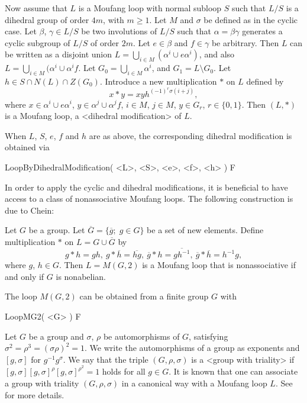 Now assume that $L$ is a Moufang loop with normal subloop $S$ such that $L/S$
is a dihedral group of order $4m$, with $m\ge 1$. Let $M$ and $\sigma$ be
defined as in the cyclic case. Let $\beta$, $\gamma\in L/S$ be two involutions
of $L/S$ such that $\alpha=\beta\gamma$ generates a cyclic subgroup of $L/S$ of
order $2m$. Let $e\in\beta$ and $f\in\gamma$ be arbitrary. Then $L$ can be
written as a disjoint union $L=\bigcup_{i\in M}(\alpha^i\cup e\alpha^i)$, and
also $L=\bigcup_{i\in M}(\alpha^i\cup \alpha^if$. Let $G_0=\bigcup_{i\in
M}\alpha^i$, and $G_1=L\setminus G_0$. Let $h\in S\cap N(L)\cap Z(G_0)$.
Introduce a new multiplication $\ast$ on $L$ defined by
$$
    x\ast y = xyh^{(-1)^r\sigma(i+j)},
$$
where $x\in\alpha^i\cup e\alpha^i$, $y\in\alpha^j\cup \alpha^jf$, $i\in M$,
$j\in M$, $y\in G_r$, $r\in\{0,1\}$. Then $(L,\ast)$ is a Moufang loop, a
<dihedral modification> of $L$.

When $L$, $S$, $e$, $f$ and $h$ are as above, the corresponding dihedral
modification is obtained via

\>LoopByDihedralModification( <L>, <S>, <e>, <f>, <h> ) F

In order to apply the cyclic and dihedral modifications, it is beneficial to
have access to a class of nonassociative Moufang loops. The following
construction is due to Chein:

Let $G$ be a group. Let $\overline{G}=\{\overline{g};\;g\in G\}$ be a set of
new elements. Define multiplication $\ast$ on $L=G\cup \overline{G}$ by
$$
    g\ast h = gh,\ g\ast\overline{h}=\overline{hg},\
    \overline{g}\ast h = \overline{gh^{-1}},\
    \overline{g}\ast \overline{h}=h^{-1}g,
$$
where $g$, $h\in G$. Then $L=M(G,2)$ is a Moufang loop that is nonassociative
if and only if $G$ is nonabelian.

The loop $M(G,2)$ can be obtained from a finite group $G$ with

\>LoopMG2( <G> ) F


Let $G$ be a group and $\sigma$, $\rho$ be automorphisms of $G$, satisfying
$\sigma^2 = \rho^3 = (\sigma \rho)^2 = 1$. We write the automorphisms of a
group as exponents and $[g,\sigma]$ for $g^{-1}g^\sigma$. We say that the
triple $(G,\rho,\sigma)$ is a <group with triality>
if $[g, \sigma] [g,\sigma]^\rho [g,\sigma]^{\rho^2} =1$ holds for all $g \in
G$. It is known that one can associate a group with triality $(G,\rho,\sigma)$
in a canonical way with a Moufang loop $L$. See \cite{NaVo2003} for more
details.

